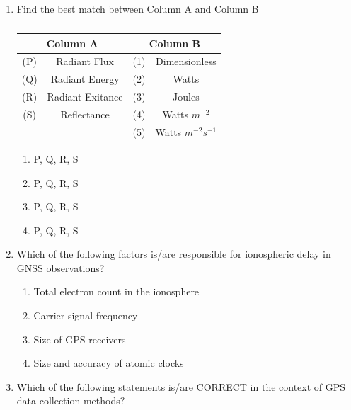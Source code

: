 \documentclass[12pt]{article}
\begin{document}
\begin{enumerate}
\item Find the best match between Column A and Column B

\begin{table}[H]
         \centering
         \caption{}
         \begin{tabular}{|c|c|c|c|}
         \hline
              \multicolumn{2}{|c}{\textbf{Column A}}&  \multicolumn{2}{|c|}{\textbf{Column B}}\\ \hline
              (P)& Radiant Flux& (1) & Dimensionless\\ \hline
              (Q)& Radiant Energy& (2) & Watts\\ \hline
              (R)& Radiant Exitance& (3) & Joules\\ \hline
              (S)& Reflectance& (4) & Watts $m^{-2}$\\ \hline 
              \multicolumn{2}{|c|}{}& (5) & Watts $m^{-2}s^{-1}$\\ \hline
         \end{tabular}
         \label{tab:placeholder}
     \end{table}

\begin{enumerate}
    \item P, Q, R, S 
   \item P, Q, R, S 
   \item P, Q, R, S 
   \item P, Q, R, S

   
\end{enumerate}

\item Which of the following factors is/are responsible for ionospheric delay in GNSS
observations? 

\begin{enumerate}
    \item Total electron count in the ionosphere 
   \item Carrier signal frequency 
   \item Size of GPS receivers 
   \item Size and accuracy of atomic clocks
\end{enumerate}

\item Which of the following statements is/are CORRECT in the context of GPS data
collection methods?


\end{enumerate}
\end{document}
